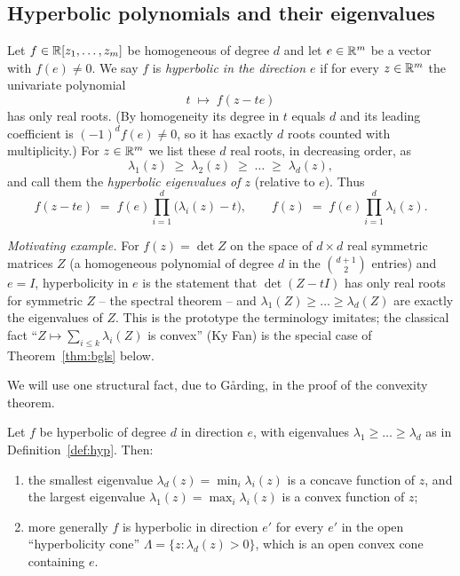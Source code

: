 \subsection*{Hyperbolic polynomials and their eigenvalues}

\begin{qfourdefinition}[hyperbolicity]\label{def:hyp}
Let $f\in\mathbb{R}[z_1,\dots,z_m]$ be homogeneous of degree $d$ and let
$e\in\mathbb{R}^m$ be a vector with $f(e)\ne0$. We say $f$ is \emph{hyperbolic in
the direction $e$} if for every $z\in\mathbb{R}^m$ the univariate polynomial
\[
t\;\longmapsto\;f(z-te)
\]
has only real roots. (By homogeneity its degree in $t$ equals $d$ and its
leading coefficient is $(-1)^d f(e)\ne0$, so it has exactly $d$ roots counted
with multiplicity.) For $z\in\mathbb{R}^m$ we list these $d$ real roots, in
decreasing order, as
\[
\lambda_1(z)\;\ge\;\lambda_2(z)\;\ge\;\dots\;\ge\;\lambda_d(z),
\]
and call them the \emph{hyperbolic eigenvalues of $z$} (relative to $e$). Thus
\[
f(z-te)\;=\;f(e)\prod_{i=1}^d\bigl(\lambda_i(z)-t\bigr),\qquad
f(z)\;=\;f(e)\prod_{i=1}^d\lambda_i(z).
\]
\end{qfourdefinition}

\noindent\emph{Motivating example.} For $f(z)=\det Z$ on the space of
$d\times d$ real symmetric matrices $Z$ (a homogeneous polynomial of degree $d$
in the $\binom{d+1}{2}$ entries) and $e=I$, hyperbolicity in $e$ is the
statement that $\det(Z-tI)$ has only real roots for symmetric $Z$ -- the
spectral theorem -- and $\lambda_1(Z)\ge\dots\ge\lambda_d(Z)$ are exactly the
eigenvalues of $Z$. This is the prototype the terminology imitates; the
classical fact ``$Z\mapsto\sum_{i\le k}\lambda_i(Z)$ is convex'' (Ky Fan) is the
special case of Theorem~\ref{thm:bgls} below.

\smallskip
We will use one structural fact, due to G\aa rding, in the proof of the
convexity theorem.

\begin{qfourlemma}\label{lem:garding}
Let $f$ be hyperbolic of degree $d$ in direction $e$, with eigenvalues
$\lambda_1\ge\dots\ge\lambda_d$ as in Definition~\ref{def:hyp}. Then:
\begin{enumerate}\setlength\itemsep{2pt}
\item the smallest eigenvalue
$\lambda_d(z)=\min_i\lambda_i(z)$ is a concave function of $z$, and the largest
eigenvalue $\lambda_1(z)=\max_i\lambda_i(z)$ is a convex function of $z$;
\item more generally $f$ is hyperbolic in direction $e'$ for every $e'$ in the
open ``hyperbolicity cone'' $\Lambda=\{z:\lambda_d(z)>0\}$, which is an open
convex cone containing $e$.
\end{enumerate}
\end{qfourlemma}

